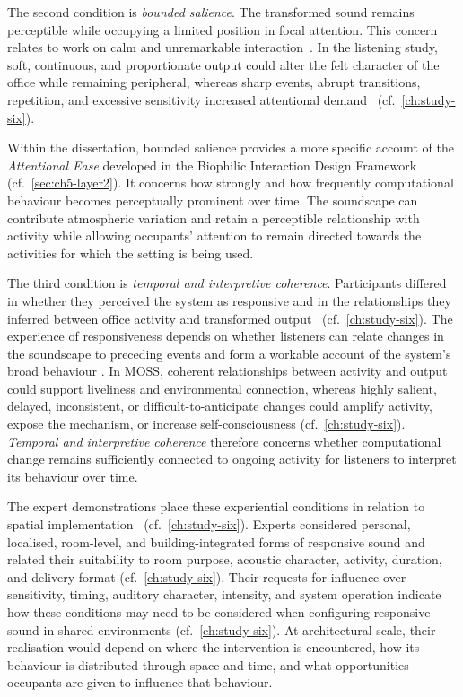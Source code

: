 The second condition is \emph{bounded salience}. The transformed sound remains perceptible while occupying a limited position in focal attention. This concern relates to work on calm and unremarkable interaction~\cite{case2015calm,tolmie2002unremarkable,harman2016notifall}. In the listening study, soft, continuous, and proportionate output could alter the felt character of the office while remaining peripheral, whereas sharp events, abrupt transitions, repetition, and excessive sensitivity increased attentional demand~\cite{rao2027biophilic} (cf.~\autoref{ch:study-six}).


Within the dissertation, bounded salience provides a more specific account of the \emph{Attentional Ease} developed in the Biophilic Interaction Design Framework~\cite{rao2026biophilic} (cf.~\autoref{sec:ch5-layer2}). It concerns how strongly and how frequently computational behaviour becomes perceptually prominent over time. The soundscape can contribute atmospheric variation and retain a perceptible relationship with activity while allowing occupants' attention to remain directed towards the activities for which the setting is being used.

The third condition is \emph{temporal and interpretive coherence}. Participants differed in whether they perceived the system as responsive and in the relationships they inferred between office activity and transformed output~\cite{rao2027biophilic} (cf.~\autoref{ch:study-six}). The experience of responsiveness depends on whether listeners can relate changes in the soundscape to preceding events and form a workable account of the system's broad behaviour \cite{bellotti2002making,lim2009and}. In MOSS, coherent relationships between activity and output could support liveliness and environmental connection, whereas highly salient, delayed, inconsistent, or difficult-to-anticipate changes could amplify activity, expose the mechanism, or increase self-consciousness (cf.~\autoref{ch:study-six}). \emph{Temporal and interpretive coherence} therefore concerns whether computational change remains sufficiently connected to ongoing activity for listeners to interpret its behaviour over time.

The expert demonstrations place these experiential conditions in relation to spatial implementation~\cite{rao2027biophilic} (cf.~\autoref{ch:study-six}). Experts considered personal, localised, room-level, and building-integrated forms of responsive sound and related their suitability to room purpose, acoustic character, activity, duration, and delivery format (cf.~\autoref{ch:study-six}).  Their requests for influence over sensitivity, timing, auditory character, intensity, and system operation indicate how these conditions may need to be considered when configuring responsive sound in shared environments (cf.~\autoref{ch:study-six}). At architectural scale, their realisation would depend on where the intervention is encountered, how its behaviour is distributed through space and time, and what opportunities occupants are given to influence that behaviour.

